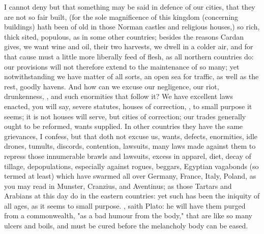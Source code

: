 I cannot deny but that something may be said in defence of our cities,
that they are not so fair built, (for the sole magnificence
of this kingdom (concerning buildings) hath been of old in those Norman castles
and religious houses,) so rich, thick sited, populous, as in some other
countries; besides the reasons Cardan gives,  we want wine and oil, their two harvests, we dwell in a colder air, and
for that cause must a little more liberally feed of flesh,
as all northern countries do: our provisions will not therefore extend to the
maintenance of so many; yet notwithstanding we have matter of all sorts, an
open sea for traffic, as well as the rest, goodly havens. And how can we excuse
our negligence, our riot, drunkenness, \etc{}, and such enormities that follow
it? We have excellent laws enacted, you will say, severe statutes, houses of
correction, \etc{}, to small purpose it seems; it is not houses will serve, but
cities of correction; our trades generally ought to be
reformed, wants supplied. In other countries they have the same grievances, I
confess, but that doth not excuse us, wants, defects,
enormities, idle drones, tumults, discords, contention, lawsuits, many laws
made against them to repress those innumerable brawls and lawsuits, excess in
apparel, diet, decay of tillage, depopulations, especially
against rogues, beggars, Egyptian vagabonds (so termed at least) which have
swarmed all over Germany, France, Italy, Poland, as you may
read in Munster, Cranzius, and Aventinus; as those Tartars
and Arabians at this day do in the eastern countries: yet such has been the
iniquity of all ages, as it seems to small purpose. , saith Plato: he will have them purged
from a commonwealth, "as a bad humour
from the body," that are like so many ulcers and boils, and must be cured
before the melancholy body can be eased.

